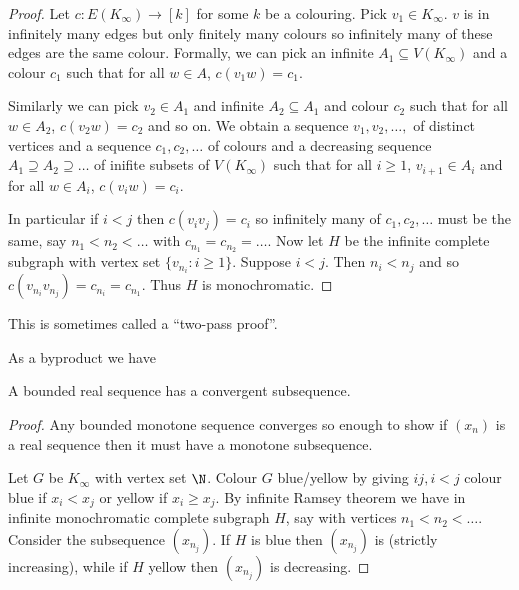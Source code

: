 \documentclass[a4paper]{article}
\begin{document}
\begin{proof}
  Let \(c: E(K_\infty) \to [k]\) for some \(k\) be a colouring. Pick \(v_1 \in K_\infty\). \(v\) is in infinitely many edges but only finitely many colours so infinitely many of these edges are the same colour. Formally, we can pick an infinite \(A_1 \subseteq V(K_\infty)\) and a colour \(c_1\) such that for all \(w \in A\), \(c(v_1 w) = c_1\).

  Similarly we can pick \(v_2 \in A_1\) and infinite \(A_2 \subseteq A_1\) and colour \(c_2\) such that for all \(w \in A_2\), \(c(v_2w) = c_2\) and so on. We obtain a sequence \(v_1, v_2, \dots, \) of distinct vertices and a sequence \(c_1, c_2, \dots\) of colours and a decreasing sequence \(A_1 \supseteq A_2 \supseteq \dots\) of inifite subsets of \(V(K_\infty)\) such that for all \(i \geq 1\), \(v_{i + 1} \in A_i\) and for all \(w \in A_i\), \(c(v_iw) = c_i\).

  In particular if \(i < j\) then \(c(v_iv_j) = c_i\) so infinitely many of \(c_1, c_2, \dots\) must be the same, say \(n_1 < n_2 < \dots\) with \(c_{n_1} = c_{n_2} = \dots\). Now let \(H\) be the infinite complete subgraph with vertex set \(\{v_{n_i}: i \geq 1\}\). Suppose \(i < j\). Then \(n_i < n_j\) and so \(c(v_{n_i}v_{n_j}) = c_{n_i} = c_{n_1}\). Thus \(H\) is monochromatic.
\end{proof}

\begin{remark}
  This is sometimes called a ``two-pass proof''.
\end{remark}

As a byproduct we have

\begin{corollary}
  A bounded real sequence has a convergent subsequence.
\end{corollary}

\begin{proof}
  Any bounded monotone sequence converges so enough to show if \((x_n)\) is a real sequence then it must have a monotone subsequence.

  Let \(G\) be \(K_\infty\) with vertex set \(\N\). Colour \(G\) blue/yellow by giving \(ij, i < j\) colour blue if \(x_i < x_j\) or yellow if \(x_i \geq x_j\). By infinite Ramsey theorem we have in infinite monochromatic complete subgraph \(H\), say with vertices \(n_1 < n_2 < \dots\). Consider the subsequence \((x_{n_j})\). If \(H\) is blue then \((x_{n_j})\) is (strictly increasing), while if \(H\) yellow then \((x_{n_j})\) is decreasing.
\end{proof}
\end{document}

